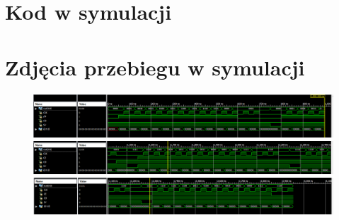 

\section{Kod w symulacji}



\clearpage

\section{Zdjęcia przebiegu w symulacji}
\begin{figure}[!htb]
    \centering
    \includegraphics[width=18.5cm]{./images/ss1.png}
    \includegraphics[width=18.5cm]{./images/ss2.png}
    \includegraphics[width=18.5cm]{./images/ss3.png}
\end{figure}